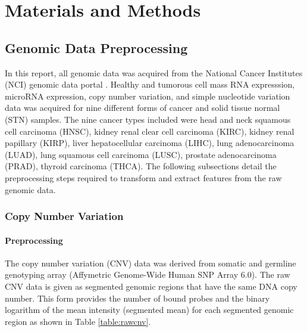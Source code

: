 \chapter{Materials and Methods} \label{chap:materials}

\section{Genomic Data Preprocessing}

In this report, all genomic data was acquired from the National Cancer Institutes (NCI) genomic data portal \cite{grossman2016toward}. Healthy and tumorous cell mass RNA expresssion, microRNA expression, copy number variation, and simple nucleotide variation data was acquired for nine different forms of cancer and solid tissue normal (STN) samples. The nine cancer types included were head and neck squamous cell carcinoma (HNSC), kidney renal clear cell carcinoma (KIRC), kidney renal papillary (KIRP), liver hepatocellular carcinoma (LIHC), lung adenocarcinoma (LUAD), lung squamous cell carcinoma (LUSC), prostate adenocarcinoma (PRAD), thyroid carcinoma (THCA). The following subsections detail the preprocessing steps required to transform and extract features from the raw genomic data.

\subsection{Copy Number Variation}

\subsubsection{Preprocessing}

The copy number variation (CNV) data was derived from somatic and germline genotyping array (Affymetric Genome-Wide Human SNP Array 6.0). The raw CNV data is given as segmented genomic regions that have the same DNA copy number. This form provides the number of bound probes and the binary logarithm of the mean intensity (segmented mean) for each segmented genomic region as shown in Table \ref{table:rawcnv}.

